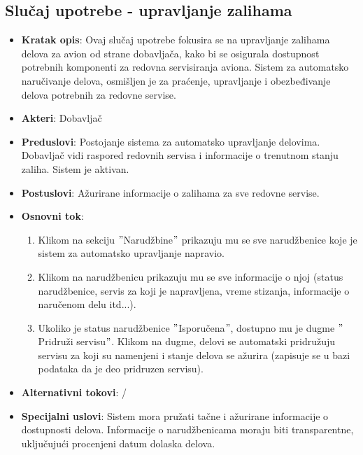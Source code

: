 \documentclass[a4paper]{article}
\begin{document}
\subsection{Slučaj upotrebe - upravljanje zalihama}
\label{subsec:redovan_servis}
\begin{itemize}
    \item \textbf{Kratak opis}: Ovaj slučaj upotrebe fokusira se na upravljanje zalihama delova za avion od strane dobavljača, kako bi se osigurala dostupnost potrebnih komponenti za redovna servisiranja aviona. Sistem za automatsko naručivanje delova, osmišljen je za praćenje, upravljanje i obezbeđivanje delova potrebnih za redovne servise.
    \item \textbf{Akteri}: Dobavljač
    \item \textbf{Preduslovi}: Postojanje sistema za automatsko upravljanje delovima. Dobavljač vidi raspored redovnih servisa i informacije o trenutnom stanju zaliha. Sistem je aktivan.
    \item \textbf{Postuslovi}: Ažurirane informacije o zalihama za sve redovne servise. 
    \item \textbf{Osnovni tok}:
        \begin{enumerate}
            \item Klikom na sekciju $"$Narudžbine$"$ prikazuju mu se sve narudžbenice koje je sistem za automatsko upravljanje napravio.
            \item Klikom na narudžbenicu prikazuju mu se sve informacije o njoj (status narudžbenice, servis za koji je napravljena, vreme stizanja, informacije o naručenom delu itd...).
            \item Ukoliko je status narudžbenice $"$Isporučena$"$, dostupno mu je dugme $"$Pridruži servisu$"$. Klikom na dugme, delovi se automatski pridružuju servisu za koji su namenjeni i stanje delova se ažurira (zapisuje se u bazi podataka da je deo pridruzen servisu).
        \end{enumerate}
    \item \textbf{Alternativni tokovi}: /
    \item \textbf{Specijalni uslovi}: Sistem mora pružati tačne i ažurirane informacije o dostupnosti delova. Informacije o narudžbenicama moraju biti transparentne, uključujući procenjeni datum dolaska delova.
\end{itemize}
\end{document}
